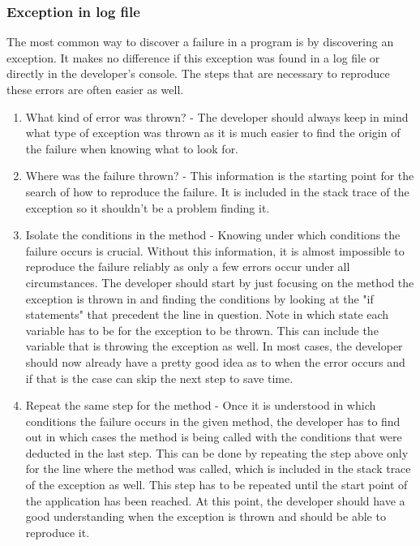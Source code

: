 \subsubsection{Exception in log file}
The most common way to discover a failure in a program is by discovering an exception. It makes no difference if this exception was found in a log file or directly in the developer's console. The steps that are necessary to reproduce these errors are often easier as well.

\begin{enumerate}
  \item What kind of error was thrown? - The developer should always keep in mind what type of exception was thrown as it is much easier to find the origin of the failure when knowing what to look for.
  \item Where was the failure thrown? - This information is the starting point for the search of how to reproduce the failure. It is included in the stack trace of the exception so it shouldn't be a problem finding it.
  \item Isolate the conditions in the method - Knowing under which conditions the failure occurs is crucial. Without this information, it is almost impossible to reproduce the failure reliably as only a few errors occur under all circumstances. The developer should start by just focusing on the method the exception is thrown in and finding the conditions by looking at the "if statements" that precedent the line in question. Note in which state each variable has to be for the exception to be thrown. This can include the variable that is throwing the exception as well. In most cases, the developer should now already have a pretty good idea as to when the error occurs and if that is the case can skip the next step to save time.
  \item Repeat the same step for the method - Once it is understood in which conditions the failure occurs in the given method, the developer has to find out in which cases the method is being called with the conditions that were deducted in the last step. This can be done by repeating the step above only for the line where the method was called, which is included in the stack trace of the exception as well. This step has to be repeated until the start point of the application has been reached. At this point, the developer should have a good understanding when the exception is thrown and should be able to reproduce it.
\end{enumerate}

